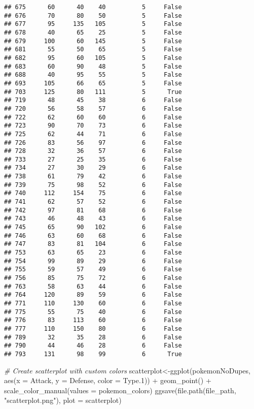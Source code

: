 \documentclass[
]{article}
\newenvironment{Shaded}{\begin{snugshade}}{\end{snugshade}}
\newcommand{\AttributeTok}[1]{\textcolor[rgb]{0.77,0.63,0.00}{#1}}
\newcommand{\CommentTok}[1]{\textcolor[rgb]{0.56,0.35,0.01}{\textit{#1}}}
\newcommand{\FloatTok}[1]{\textcolor[rgb]{0.00,0.00,0.81}{#1}}
\newcommand{\FunctionTok}[1]{\textcolor[rgb]{0.00,0.00,0.00}{#1}}
\newcommand{\NormalTok}[1]{#1}
\newcommand{\OtherTok}[1]{\textcolor[rgb]{0.56,0.35,0.01}{#1}}
\newcommand{\SpecialCharTok}[1]{\textcolor[rgb]{0.00,0.00,0.00}{#1}}
\newcommand{\StringTok}[1]{\textcolor[rgb]{0.31,0.60,0.02}{#1}}
\begin{document}
\begin{verbatim}
## 675      60      40    40          5     False
## 676      70      80    50          5     False
## 677      95     135   105          5     False
## 678      40      65    25          5     False
## 679     100      60   145          5     False
## 681      55      50    65          5     False
## 682      95      60   105          5     False
## 683      60      90    48          5     False
## 688      40      95    55          5     False
## 693     105      66    65          5     False
## 703     125      80   111          5      True
## 719      48      45    38          6     False
## 720      56      58    57          6     False
## 722      62      60    60          6     False
## 723      90      70    73          6     False
## 725      62      44    71          6     False
## 726      83      56    97          6     False
## 728      32      36    57          6     False
## 733      27      25    35          6     False
## 734      27      30    29          6     False
## 738      61      79    42          6     False
## 739      75      98    52          6     False
## 740     112     154    75          6     False
## 741      62      57    52          6     False
## 742      97      81    68          6     False
## 743      46      48    43          6     False
## 745      65      90   102          6     False
## 746      63      60    68          6     False
## 747      83      81   104          6     False
## 753      63      65    23          6     False
## 754      99      89    29          6     False
## 755      59      57    49          6     False
## 756      85      75    72          6     False
## 763      58      63    44          6     False
## 764     120      89    59          6     False
## 771     110     130    60          6     False
## 775      55      75    40          6     False
## 776      83     113    60          6     False
## 777     110     150    80          6     False
## 789      32      35    28          6     False
## 790      44      46    28          6     False
## 793     131      98    99          6      True
\end{verbatim}

\begin{Shaded}
\begin{Highlighting}[]
\CommentTok{\# Create scatterplot with custom colors}
\NormalTok{scatterplot}\OtherTok{\textless{}{-}}\FunctionTok{ggplot}\NormalTok{(pokemonNoDupes, }\FunctionTok{aes}\NormalTok{(}\AttributeTok{x =}\NormalTok{ Attack, }\AttributeTok{y =}\NormalTok{ Defense, }\AttributeTok{color =}\NormalTok{ Type}\FloatTok{.1}\NormalTok{)) }\SpecialCharTok{+}
  \FunctionTok{geom\_point}\NormalTok{() }\SpecialCharTok{+}
  \FunctionTok{scale\_color\_manual}\NormalTok{(}\AttributeTok{values =}\NormalTok{ pokemon\_colors)}
\FunctionTok{ggsave}\NormalTok{(}\FunctionTok{file.path}\NormalTok{(file\_path, }\StringTok{"scatterplot.png"}\NormalTok{), }\AttributeTok{plot =}\NormalTok{ scatterplot)}
\end{Highlighting}
\end{Shaded}
\end{document}
